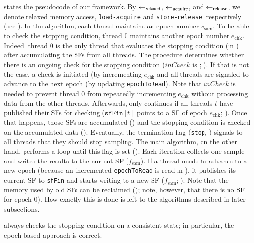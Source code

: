  states the pseudocode of our framework.
By $\operatorname{\gets_\mathsf{relaxed}}$, $\operatorname{\gets_\mathsf{acquire}}$, and $\operatorname{\gets_\mathsf{release}}$, we denote relaxed memory access,
\texttt{load-acquire} and \texttt{store-release}, respectively (see
).
In the algorithm, each thread maintains an epoch number $e_\mathrm{sam}$.
To be able to check the stopping condition,
thread 0 maintains another epoch number $e_\mathrm{chk}$.
Indeed, thread 0 is the only thread that evaluates the stopping condition
(in ) after accumulating the SFs from all threads.
The  procedure determines whether there is an ongoing check
for the stopping condition ($\mathit{inCheck}$ is \true;
).
If that is not the case, a check is initiated (by incrementing
$e_\mathrm{chk}$ and all threads are signaled to advance to the
next epoch (by updating \texttt{epochToRead}).
Note that $\mathit{inCheck}$ is needed to prevent thread 0
from repeatedly incrementing $e_\mathrm{chk}$ without processing
data from the other threads. Afterwards, 
only continues if all threads $t$ have published their SFs for
checking (\ie $\mathtt{sfFin}[t]$ points to a SF of epoch
$e_\mathrm{chk}$; ).
%
Once that happens, those SFs are accumulated
() and the stopping condition is
checked on the accumulated data ().
Eventually, the termination flag (\texttt{stop}, )
signals to all threads that they should stop sampling.
%
The main algorithm, on the other hand, performs a loop until this
flag is set ().
Each iteration collects one sample and writes the results to the
current SF ($f_\mathrm{sam}$).
If a thread needs to advance to a new epoch (because
an incremented \texttt{epochToRead} is read in ),
it publishes its current SF to \texttt{sfFin} and starts writing
to a new SF ($f_\mathrm{sam}$; ).
Note that the memory used by old SFs can be reclaimed ();
note, however, that there is no SF for epoch 0).
How exactly this is done is left to the algorithms described in later
subsections.

\begin{proposition}
 always checks the stopping
condition on a consistent state; in particular, the epoch-based
approach is correct.
\end{proposition}


